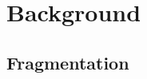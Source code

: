 \section{Background}\label{s:background}

\subsection{Fragmentation}\label{ss:fragmentation}

\begin{comment}
As shown in Figure~\ref{fig:fragmentation}, filesystem fragmentation occurs when a file is stored in non-contiguous spaces on the storage medium.
This may happens even there is enough available free space in small fragments.
In the era of HDDs, the main cause of performance degradation due to file fragmentation is seek time and rotational latency.
In HDDs, there is a need for seek time to move the disk head to the track where the requested sector is located, as well as rotational latency to find it on that track.
Fragmentation increases the overhead by requiring the disk head to move more frequently, particularly having a pronounced negative impact on read operations.

\noindent {\textbf{Filesystem Fragmentation in SSDs.}}%
In flash memory, there is no seek time or rotational latency, so early researchers generally argued that SSD performance is not affected by filesystem fragmentation.
Therefore, techniques like defragmentation were thought to have only negative impacts by reducing the lifespan of flash memory due to additional write operations~\cite{defrag-mobile:atc17,fragpicker:sosp21,defrag-lfs:apsys16,no-afraid:fast24,parallel-defrag:sac22,Defragmentation_read_collision}.
However, more recent studies have shown that filesystem aging and resultant fragmentation can also lead to performance degradation in SSDs~\cite{Problem_in_SSD_Empirical,senescence:fast17,Problem_in_SSD_Mobile_Devices,survey:ictc23}.

The first reason for this is request fragmentation.
In the Linux I/O stack, a single I/O request can only represent contiguous LBA (Logical Block Address).
Fragmentation influences the non-contiguous storage of data, causing a single I/O request to be divided into multiple smaller I/O requests.\cite{IO}
This increases the total number of I/O requests, and all requests derived from a single I/O must be completed before the next process can proceed, leading to issues in I/O performance.
If multiple I/O requests are necessary for one file, the system must generate bio structures, request structures, and I/O commands corresponding to the number of requests.
This process incurs overhead in I/O request management.


\end{comment}
